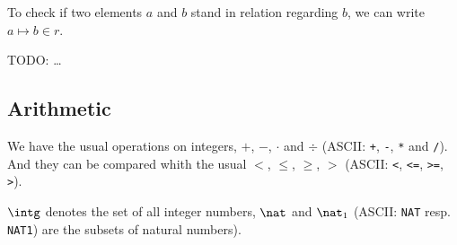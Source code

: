 To check if two elements $a$ and $b$ stand in relation regarding $b$, we can write $a\mapsto b\in r$.

TODO: \ldots

\subsection{Arithmetic}
\label{tut:arithmetic}
We have the usual operations on integers, $+$, $-$, $\cdot$ and $\div$ (ASCII: \texttt{+}, \texttt{-},
\texttt{*} and \texttt{/}). And they can be compared whith the usual $<$, $\leq$, $\geq$, $>$ (ASCII: \texttt{<}, \texttt{<=}, \texttt{>=}, \texttt{>}).

$\intg$  denotes the set of all integer numbers, $\nat$ and $\nat_1$ (ASCII: \texttt{NAT} resp. 
\texttt{NAT1}) are the subsets of natural numbers).


